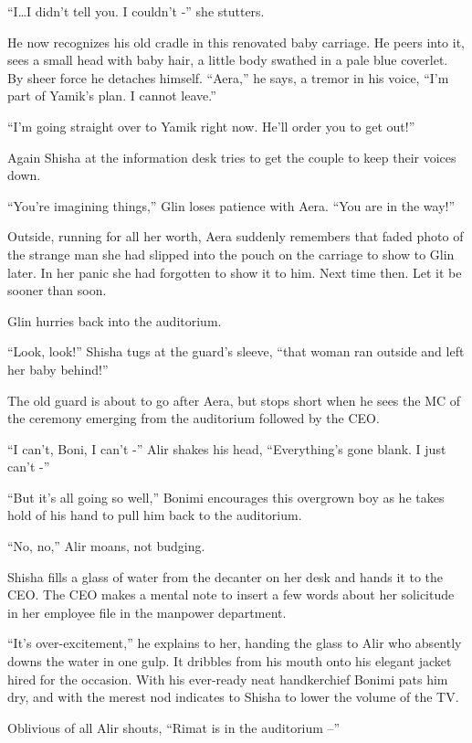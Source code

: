 \documentclass[twoside,11pt]{book}
\begin{document}
``I{\dots}I didn't tell you. I couldn't -'' she stutters.

He now recognizes his old cradle in this renovated baby carriage. He peers into it,{ }sees a small head
with baby hair, a little{ }body swathed in a pale blue coverlet. By sheer force
he detaches himself. ``Aera,'' he says, a tremor in his voice, ``I'm part of
Yamik's plan. I cannot leave.''

``I'm going straight over to Yamik right now. He'll order you to get out!''

Again Shisha at the information desk tries to get the couple to keep their voices down.

``You're imagining things,'' Glin loses patience with Aera. ``You are in the
way!''

Outside, running for all her worth, Aera suddenly remembers that faded photo of the strange man she had slipped into the
pouch on the carriage to show to Glin later. In her panic she had forgotten to show it to him. Next time then. Let it
be sooner than soon.

Glin hurries back into the auditorium.

``Look, look!'' Shisha tugs at the guard's sleeve, ``that woman ran outside and
left her baby behind!''

The old guard is about to go after Aera, but stops short when he sees the MC of the ceremony emerging from the
auditorium followed by the CEO.

``I can't, Boni, I can't -'' Alir shakes his head, ``Everything's gone blank. I just can't -''


``But it's all going so well,'' Bonimi encourages this overgrown boy as he
takes hold of his hand to pull him back to the auditorium.

``No, no,'' Alir moans, not budging.

Shisha fills a glass of water from the decanter on her desk and hands it to the CEO. The CEO makes a mental note to
insert a few words about her solicitude in her employee file in the manpower department.

``It's over-excitement,'' he explains to her, handing the glass to Alir who absently downs the
water in one gulp. It dribbles from his mouth onto his elegant jacket hired for the occasion. With his ever-ready neat
handkerchief Bonimi pats him dry, and with the merest nod indicates to Shisha to lower the volume of the TV.

Oblivious of all Alir shouts, ``Rimat is in the auditorium --''
\end{document}
